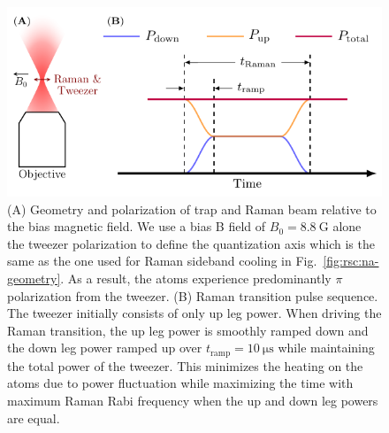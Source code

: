 \begin{figure}
  \centering
  \includegraphics[width=\textwidth]{figures/raman_spectroscopy_apparatus_sequence.pdf}
  \caption[Raman transition setup and sequence]{
    (A) Geometry and polarization of trap and Raman beam relative to the bias magnetic field.
    We use a bias B field of $B_0=8.8~\mathrm{G}$ alone the tweezer polarization
    to define the quantization axis
    which is the same as the one used for Raman sideband cooling in
    Fig.~\ref{fig:rsc:na-geometry}.
    As a result, the atoms experience predominantly $\pi$ polarization from the tweezer.
    (B) Raman transition pulse sequence.
    The tweezer initially consists of only up leg power.
    When driving the Raman transition, the up leg power is smoothly ramped down and
    the down leg power ramped up over $t_{\mathrm{ramp}}=10~\mathrm{\mu s}$
    while maintaining the total power of the tweezer.
    This minimizes the heating on the atoms due to power fluctuation while maximizing the time
    with maximum Raman Rabi frequency when the up and down leg powers are equal.
    \label{fig:raman-spectroscopy:apparatus-sequence}}
\end{figure}

